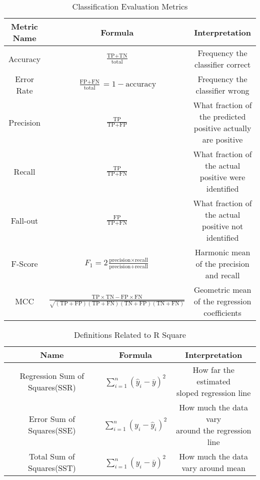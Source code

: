 \begin{table}[H]
\footnotesize
\caption{Classification Evaluation Metrics}
\label{binaryevaluate}
\begin{center}
\begin{tabular}{|c|c|c|}
\hline
\rowcolor{Graylight}
Metric Name & Formula & Interpretation\\
\hline
Accuracy  & $\frac{\text{TP} + \text{TN}}{\text{total}}$ &Frequency the classifier correct\\
\hline
Error Rate & $\frac{\text{FP} + \text{FN}}{\text{total}} = 1 - \text{accuracy}$ & Frequency the classifier wrong\\
\hline
Precision & $\frac{\text{TP}}{\text{TP} + \text{FP}}$ &\makecell{What fraction of the predicted\\ positive actually are positive}\\
\hline
Recall & $\frac{\text{TP}}{\text{TP} + \text{FN}}$ & \makecell{What fraction of the actual\\ positive were identified} \\
\hline
Fall-out & $\frac{\text{FP}}{\text{TP} + \text{FN}}$ & \makecell{What fraction of the actual\\ positive not identified} \\
\hline
F-Score & $F_1 = 2 \frac{\text{precision} \times \text{recall}}{\text{precision} + \text{recall}}	$ & \makecell{Harmonic  mean\\ of the precision and recall} \\
\hline
MCC & $\frac{\text{TP}\times\text{TN}-\text{FP}\times\text{FN}}{\sqrt{(\text{TP} + \text{FP})(\text{TP} + \text{FN})(\text{TN} + \text{FP})(\text{TN} + \text{FN})}}$ & \makecell{ Geometric mean \\of the regression coefficients} \\
\hline
\end{tabular}
\end{center}
\end{table}

\begin{table}[H]
\footnotesize
\begin{center}
\caption{Definitions Related to R Square}
\label{Rsquare}
\begin{tabular}{|c|c|c|}
\hline
\rowcolor{Graylight}
Name & Formula & Interpretation\\
\hline
Regression Sum of Squares(SSR)  & $\sum_{i=1}^{n}(\hat{y}_i-\bar{y})^2$ &\makecell{How far the estimated \\sloped regression line}\\
\hline
Error Sum of Squares(SSE) & $\sum_{i=1}^{n}(y_i-\hat{y}_i)^2$ &\makecell{How much the data vary \\around the regression line}\\
\hline
Total Sum of Squares(SST) & $\sum_{i=1}^{n}(y_i-\bar{y})^2$ &\makecell{How much the data\\ vary around mean}\\
\hline
\end{tabular}
\end{center}
\end{table}

